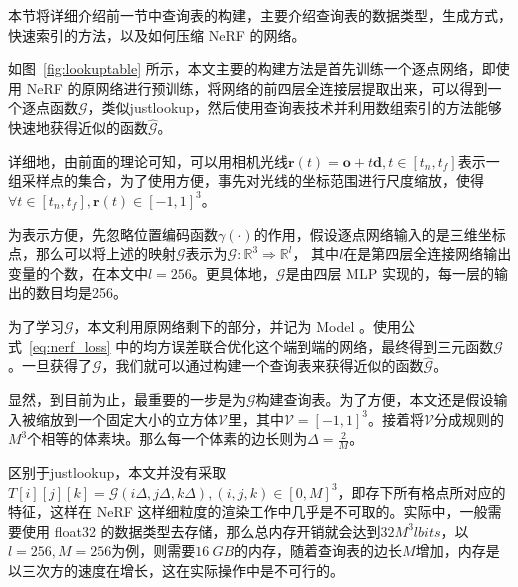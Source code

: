 本节将详细介绍前一节中查询表的构建，主要介绍查询表的数据类型，生成方式，快速索引的方法，以及如何压缩 NeRF 的网络。

如图~\ref{fig:lookuptable} 所示，本文主要的构建方法是首先训练一个逐点网络，即使用 NeRF 的原网络进行预训练，将网络的前四层全连接层提取出来，可以得到一个逐点函数$\mathcal{G}$，类似justlookup\cite{lin2019justlookup}，然后使用查询表技术并利用数组索引的方法能够快速地获得近似的函数$\hat{\mathcal{G}}$。

详细地，由前面的理论可知，可以用相机光线$\symbf{r}\left(t\right) = \symbf{o} + t \symbf{d}, t \in \left[t_n, t_f\right]$表示一组采样点的集合，为了使用方便，事先对光线的坐标范围进行尺度缩放，使得
$\forall t \in  \left[t_n, t_f\right], \symbf{r}\left(t\right) \in \left[-1, 1\right]^3$。

为表示方便，先忽略位置编码函数$\gamma\left(\cdot\right)$的作用，假设逐点网络输入的是三维坐标点，那么可以将上述的映射$\mathcal{G}$表示为$\mathcal{G}: \mathbb{R}^3 \Rightarrow \mathbb{R}^l$， 其中$l$在是第四层全连接网络输出变量的个数，在本文中$l = 256$。更具体地，$\mathcal{G}$是由四层 MLP 实现的，每一层的输出的数目均是256。

为了学习$\mathcal{G}$，本文利用原网络剩下的部分，并记为 Model 。使用公式~\ref{eq:nerf_loss} 中的均方误差联合优化这个端到端的网络，最终得到三元函数$\mathcal{G}$。一旦获得了$\mathcal{G}$，我们就可以通过构建一个查询表来获得近似的函数$\hat{\mathcal{G}}$。

显然，到目前为止，最重要的一步是为$\mathcal{G}$构建查询表。为了方便，本文还是假设输入被缩放到一个固定大小的立方体$\mathcal{V}$里，其中$\mathcal{V} = \left[-1, 1\right]^3$。接着将$\mathcal{V}$分成规则的$M^3$个相等的体素块。那么每一个体素的边长则为$\Delta = \frac{2}{M}$。

区别于justlookup\cite{lin2019justlookup}，本文并没有采取$T\left[i\right]\left[j\right]\left[k\right] = \mathcal{G}\left(i\Delta, j\Delta, k\Delta\right), \left(i, j, k\right) \in \left[0, M\right]^3$，即存下所有格点所对应的特征，这样在 NeRF 这样细粒度的渲染工作中几乎是不可取的。实际中，一般需要使用 float32 的数据类型去存储，那么总内存开销就会达到$32M^{3}l bits$，以$l = 256, M = 256$为例，则需要$\SI{16}{GB}$的内存，随着查询表的边长$M$增加，内存是以三次方的速度在增长，这在实际操作中是不可行的。

